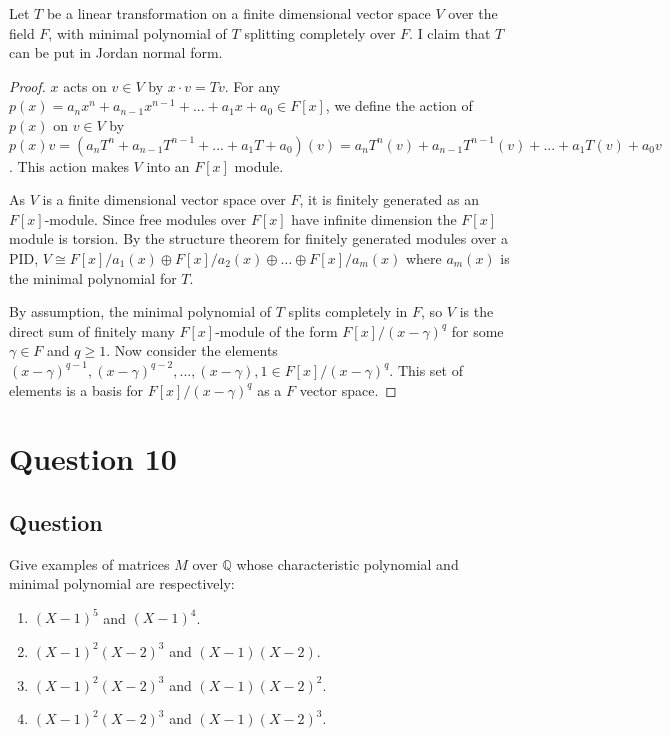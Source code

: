 \documentclass[11pt]{article}
\begin{document}
Let $T$ be a linear transformation on a finite dimensional vector space $V$ over the field $F$, with minimal polynomial of $T$ splitting completely over $F$. I claim that $T$ can be put in Jordan normal form.
\begin{proof}

$x$ acts on $v \in V$ by $x\cdot v = Tv$. For any $p(x) = a_n x^n + a_{n-1} x^{n-1}+ ... + a_1 x + a_0 \in F[x]$, we define the action of $p(x)$ on $v \in V$ by $p(x)v = (a_n T^n + a_{n-1}T^{n-1}+ ... + a_1 T +a_0)(v) = a_n T^n (v) + a_{n-1}T^{n-1} (v)+ ... + a_1 T (v)+ a_0 v$. This action makes $V$ into an $F[x]$ module. 

As $V$ is a finite dimensional vector space over $F$, it is finitely generated as an $F[x]$-module. Since free modules over $F[x]$ have infinite dimension the $F[x]$ module is torsion. By the structure theorem for finitely generated modules over a PID, $V \cong F[x]/a_1 (x) \oplus F[x]/ a_2 (x) \oplus \dots \oplus F[x]/a_m (x)$ where $a_m(x)$ is the minimal polynomial for $T$. 

By assumption, the minimal polynomial of $T$ splits completely in $F$, so $V$ is the direct sum of finitely many $F[x]$-module of the form $F[x]/(x-\gamma)^q$ for some $\gamma \in F$ and $q \geq 1$. Now consider the elements $(x-\gamma)^{q-1}, (x-\gamma)^{q-2}, ... ,(x-\gamma), 1 \in F[x]/(x-\gamma)^q$. This set of elements is a basis for $F[x]/(x-\gamma)^q$ as a $F$ vector space. 

\end{proof}

\section{Question 10}
\subsection{Question}
Give examples of matrices $M$ over $\mathbb{Q}$ whose characteristic polynomial and minimal polynomial are respectively:
\begin{enumerate}
\item $(X-1)^5$ and $(X-1)^4$.
\item $(X-1)^2(X-2)^3$ and $(X-1)(X-2)$.
\item $(X-1)^2(X-2)^3$ and $(X-1)(X-2)^2$.
\item $(X-1)^2(X-2)^3$ and $(X-1)(X-2)^3$.
\end{enumerate}
\end{document}
